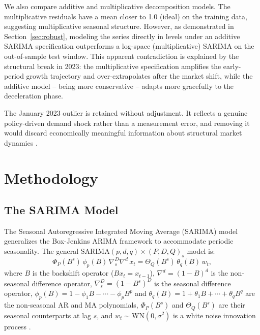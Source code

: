 \documentclass[12pt]{article}
\begin{document}
We also compare additive and multiplicative decomposition models. The multiplicative residuals have a mean closer to 1.0 (ideal) on the training data, suggesting multiplicative seasonal structure. However, as demonstrated in Section~\ref{sec:robust}, modeling the series directly in levels under an additive SARIMA specification outperforms a log-space (multiplicative) SARIMA on the out-of-sample test window. This apparent contradiction is explained by the structural break in 2023: the multiplicative specification amplifies the early-period growth trajectory and over-extrapolates after the market shift, while the additive model -- being more conservative -- adapts more gracefully to the deceleration phase.

The January 2023 outlier is retained without adjustment. It reflects a genuine policy-driven demand shock rather than a measurement error, and removing it would discard economically meaningful information about structural market dynamics \citep{chen2025}.

\section{Methodology}
\label{sec:methods}

\subsection{The SARIMA Model}

The Seasonal Autoregressive Integrated Moving Average (SARIMA) model generalizes the Box-Jenkins ARIMA framework to accommodate periodic seasonality. The general SARIMA$(p,d,q)\times(P,D,Q)_{s}$ model is:
\begin{equation}
\Phi_{P}(B^{s})\,\phi_{p}(B)\,\nabla_{s}^{D}\nabla^{d}\,x_{t}
= \Theta_{Q}(B^{s})\,\theta_{q}(B)\,w_{t},
\label{eq:sarima}
\end{equation}
where $B$ is the backshift operator ($Bx_t = x_{t-1}$), $\nabla^d = (1-B)^d$ is the non-seasonal difference operator, $\nabla_s^D = (1-B^s)^D$ is the seasonal difference operator, $\phi_p(B) = 1 - \phi_1 B - \cdots - \phi_p B^p$ and $\theta_q(B) = 1 + \theta_1 B + \cdots + \theta_q B^q$ are the non-seasonal AR and MA polynomials, $\Phi_P(B^s)$ and $\Theta_Q(B^s)$ are their seasonal counterparts at lag $s$, and $w_t \sim \text{WN}(0, \sigma^2)$ is a white noise innovation process \citep{cetin2024}.
\end{document}
